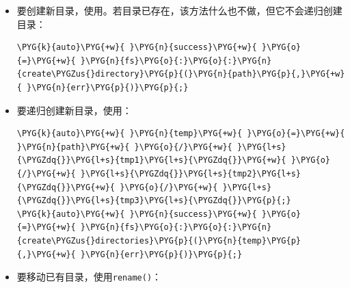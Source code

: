 \begin{itemize}
\item 要创建新目录，使用。若目录已存在，该方法什么也不做，但它不会递归创建目录：



\begin{codeblockbg}
\begin{Verbatim}[commandchars=\\\{\},breaklines=true,breakanywhere=true,fontsize=\codefont,xleftmargin=17bp]
\PYG{k}{auto}\PYG{+w}{ }\PYG{n}{success}\PYG{+w}{ }\PYG{o}{=}\PYG{+w}{ }\PYG{n}{fs}\PYG{o}{:}\PYG{o}{:}\PYG{n}{create\PYGZus{}directory}\PYG{p}{(}\PYG{n}{path}\PYG{p}{,}\PYG{+w}{ }\PYG{n}{err}\PYG{p}{)}\PYG{p}{;}
\end{Verbatim}
\end{codeblockbg}



\item 要递归创建新目录，使用：



\begin{codeblockbg}
\begin{Verbatim}[commandchars=\\\{\},breaklines=true,breakanywhere=true,fontsize=\codefont,xleftmargin=17bp]
\PYG{k}{auto}\PYG{+w}{ }\PYG{n}{temp}\PYG{+w}{ }\PYG{o}{=}\PYG{+w}{ }\PYG{n}{path}\PYG{+w}{ }\PYG{o}{/}\PYG{+w}{ }\PYG{l+s}{\PYGZdq{}}\PYG{l+s}{tmp1}\PYG{l+s}{\PYGZdq{}}\PYG{+w}{ }\PYG{o}{/}\PYG{+w}{ }\PYG{l+s}{\PYGZdq{}}\PYG{l+s}{tmp2}\PYG{l+s}{\PYGZdq{}}\PYG{+w}{ }\PYG{o}{/}\PYG{+w}{ }\PYG{l+s}{\PYGZdq{}}\PYG{l+s}{tmp3}\PYG{l+s}{\PYGZdq{}}\PYG{p}{;}
\PYG{k}{auto}\PYG{+w}{ }\PYG{n}{success}\PYG{+w}{ }\PYG{o}{=}\PYG{+w}{ }\PYG{n}{fs}\PYG{o}{:}\PYG{o}{:}\PYG{n}{create\PYGZus{}directories}\PYG{p}{(}\PYG{n}{temp}\PYG{p}{,}\PYG{+w}{ }\PYG{n}{err}\PYG{p}{)}\PYG{p}{;}
\end{Verbatim}
\end{codeblockbg}



\item 要移动已有目录，使用\texttt{rename()}：




\end{itemize}
